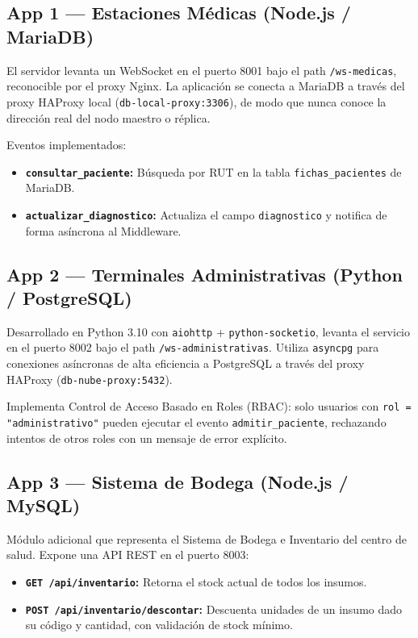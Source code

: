 \documentclass[11pt,a4paper]{article}
\begin{document}
\subsection{App 1 — Estaciones Médicas (Node.js / MariaDB)}

El servidor levanta un WebSocket en el puerto 8001 bajo el path \texttt{/ws-medicas},
reconocible por el proxy Nginx. La aplicación se conecta a MariaDB a través del
proxy HAProxy local (\texttt{db-local-proxy:3306}), de modo que nunca conoce
la dirección real del nodo maestro o réplica.

Eventos implementados:
\begin{itemize}
    \item \textbf{\texttt{consultar\_paciente}:} Búsqueda por RUT en la tabla
          \texttt{fichas\_pacientes} de MariaDB.
    \item \textbf{\texttt{actualizar\_diagnostico}:} Actualiza el campo
          \texttt{diagnostico} y notifica de forma asíncrona al Middleware.
\end{itemize}

\subsection{App 2 — Terminales Administrativas (Python / PostgreSQL)}

Desarrollado en Python 3.10 con \texttt{aiohttp} + \texttt{python-socketio}, levanta
el servicio en el puerto 8002 bajo el path \texttt{/ws-administrativas}.
Utiliza \texttt{asyncpg} para conexiones asíncronas de alta eficiencia a PostgreSQL
a través del proxy HAProxy (\texttt{db-nube-proxy:5432}).

Implementa Control de Acceso Basado en Roles (RBAC): solo usuarios con
\texttt{rol = "administrativo"} pueden ejecutar el evento \texttt{admitir\_paciente},
rechazando intentos de otros roles con un mensaje de error explícito.

\subsection{App 3 — Sistema de Bodega (Node.js / MySQL)}

Módulo adicional que representa el Sistema de Bodega e Inventario del centro de salud.
Expone una API REST en el puerto 8003:

\begin{itemize}
    \item \textbf{\texttt{GET /api/inventario}:} Retorna el stock actual de todos los insumos.
    \item \textbf{\texttt{POST /api/inventario/descontar}:} Descuenta unidades de un insumo
          dado su código y cantidad, con validación de stock mínimo.
\end{itemize}
\end{document}
